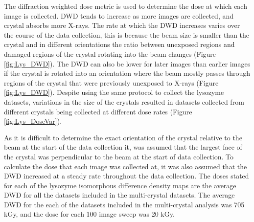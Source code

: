 The diffraction weighted dose metric is used to determine the dose at which each image is collected. DWD tends to increase as more images are collected, and crystal absorbs more X-rays. The rate at which the DWD increases varies over the course of the data collection, this is because the beam size is smaller than the crystal and in different orientations the ratio between unexposed regions and damaged regions of the crystal rotating into the beam changes (Figure \ref{fig:Lys_DWD}). The DWD can also be lower for later images than earlier images if the crystal is rotated into an orientation where the beam mostly passes through regions of the crystal that were previously unexposed to X-rays (Figure \ref{fig:Lys_DWD}). Despite using the same protocol to collect the lysozyme datasets, variations in the size of the crystals resulted in datasets collected from different crystals being collected at different dose rates (Figure \ref{fig:Lys_DoseVar}).

As it is difficult to determine the exact orientation of the crystal relative to the beam at the start of the data collection it, was assumed that the largest face of the crystal was perpendicular to the beam at the start of data collection. To calculate the dose that each image was collected at, it was also assumed that the DWD increased at a steady rate throughout the data collection. The doses stated for each of the lysozyme isomorphous difference density maps are the average DWD for all the datasets included in the multi-crystal datasets. The average DWD for the each of the datasets included in the multi-crystal analysis was 705 kGy, and the dose for each 100 image sweep was 20 kGy.      

